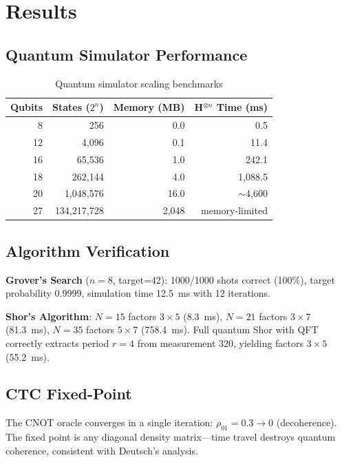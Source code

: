 \documentclass[12pt,a4paper]{article}
\begin{document}

\section{Results}

\subsection{Quantum Simulator Performance}

\begin{table}[H]
\centering
\caption{Quantum simulator scaling benchmarks}
\label{tab:qubit}
\begin{tabular}{rrrr}
\toprule
\textbf{Qubits} & \textbf{States ($2^n$)} & \textbf{Memory (MB)} & \textbf{H$^{\otimes n}$ Time (ms)} \\
\midrule
8  & 256            & 0.0   & 0.5 \\
12 & 4,096          & 0.1   & 11.4 \\
16 & 65,536         & 1.0   & 242.1 \\
18 & 262,144        & 4.0   & 1,088.5 \\
20 & 1,048,576      & 16.0  & $\sim$4,600 \\
27 & 134,217,728    & 2,048 & memory-limited \\
\bottomrule
\end{tabular}
\end{table}

\subsection{Algorithm Verification}

\textbf{Grover's Search} ($n=8$, target=42): 1000/1000 shots correct (100\%), target probability 0.9999, simulation time 12.5~ms with 12 iterations.

\textbf{Shor's Algorithm}: $N=15$ factors $3 \times 5$ (8.3~ms), $N=21$ factors $3 \times 7$ (81.3~ms), $N=35$ factors $5 \times 7$ (758.4~ms). Full quantum Shor with QFT correctly extracts period $r=4$ from measurement 320, yielding factors $3 \times 5$ (55.2~ms).

\subsection{CTC Fixed-Point}

The CNOT oracle converges in a single iteration: $\rho_{01} = 0.3 \rightarrow 0$ (decoherence). The fixed point is any diagonal density matrix—time travel destroys quantum coherence, consistent with Deutsch's analysis.
\end{document}
